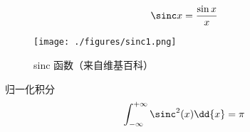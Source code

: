 
\begin{equation}
\sinc x = \frac{\sin x}{x}
\end{equation}

\begin{figure}[ht]
\centering
\texttt{[image: ./figures/sinc1.png]}
\caption{sinc 函数（来自维基百科）} \label{sinc_fig1}
\end{figure}

归一化积分
\begin{equation}
\int_{-\infty}^{+\infty} \sinc^2(x) \dd{x} = \pi
\end{equation}
